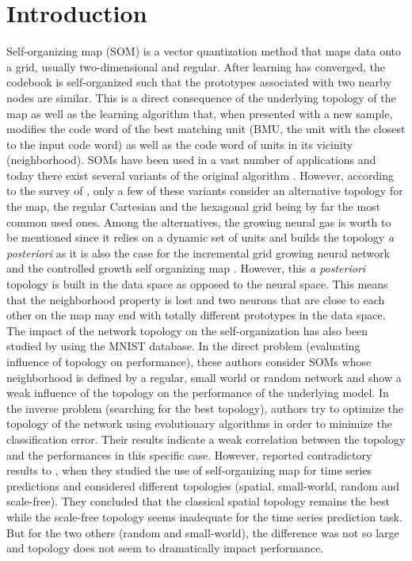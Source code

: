 \section{Introduction}

Self-organizing map \citep{Kohonen:1982} (SOM) is a vector quantization method that maps data onto a grid, usually two-dimensional and regular. After learning has converged, the codebook is self-organized such that the prototypes associated with two nearby nodes are similar. This is a direct consequence of the underlying topology of the map as well as the learning algorithm that, when presented with a new sample, modifies the code word of the best matching unit (BMU, the unit with the closest to the input code word) as well as the code word of units in its vicinity (neighborhood). SOMs have been used in a vast number of applications \citep{Kaski:1998,Oja:2003,Polla:2009} and today there exist several variants of the original algorithm \citep{Kohonen:2001}. However, according to the survey of \citep{Astudillo:2014}, only a few of these variants consider an alternative topology for the map, the regular Cartesian and the hexagonal grid being by far the most common used ones. Among the alternatives, the growing neural gas \citep{Fritzke:1994} is worth to be mentioned since it relies on a dynamic set of units and builds the topology {\em a posteriori} as it is also the case for the incremental grid growing neural network \citep{Blackmore:1995} and the controlled growth self organizing map \citep{Alahakoon:2000}. However, this {\em a posteriori} topology is built in the data space as opposed to the neural space. This means that the neighborhood property is lost and two neurons that are close to each other on the map may end with totally different prototypes in the data space. The impact of the network topology on the self-organization has also been studied by \citep{Jiang:2009} using the MNIST database. In the direct problem (evaluating influence of topology on performance), these authors consider SOMs whose neighborhood is defined by a regular, small world or random network and show a weak influence of the topology on the performance of the underlying model. In the inverse problem (searching for the best topology), authors try to optimize the topology of the network using evolutionary algorithms \citep{Eiben:2003} in order to minimize the classification error. Their results indicate a weak correlation between the topology and the performances in this specific case. However, \citep{Burguillo:2013} reported contradictory results to \citep{Eiben:2003}, when they studied the use of self-organizing map for time series predictions and considered different topologies (spatial, small-world, random and scale-free). They concluded that the classical spatial topology remains the best while the scale-free topology seems inadequate for the time series prediction task. But for the two others (random and small-world), the difference was not so large and topology does not seem to dramatically impact performance.

